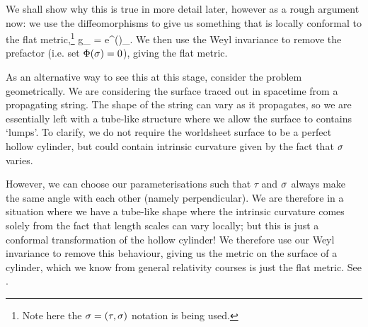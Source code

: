 We shall show why this is true in more detail later, however as a rough argument now: we use the diffeomorphisms to give us something that is locally conformal to the flat metric,\footnote{Note here the $\sigma=(\tau,\sigma)$ notation is being used.} 
\bse 
    g_{\a\beta} = e^{\Phi(\sig)}\eta_{\a\beta}. 
\ese 
We then use the Weyl invariance to remove the prefactor (i.e. set $\Phi(\sigma)=0$), giving the flat metric. 

As an alternative way to see this at this stage, consider the problem geometrically. We are considering the surface traced out in spacetime from a propagating string. The shape of the string can vary as it propagates, so we are essentially left with a tube-like structure where we allow the surface to contains `lumps'. To clarify, we do not require the worldsheet surface to be a perfect hollow cylinder, but could contain intrinsic curvature given by the fact that $\sigma$ varies. 

However, we can choose our parameterisations such that $\tau$ and $\sigma$ always make the same angle with each other (namely perpendicular). We are therefore in a situation where we have a tube-like shape where the intrinsic curvature comes solely from the fact that length scales can vary locally; but this is just a conformal transformation of the hollow cylinder! We therefore use our Weyl invariance to remove this behaviour, giving us the metric on the surface of a cylinder, which we know from general relativity courses is just the flat metric. See .

